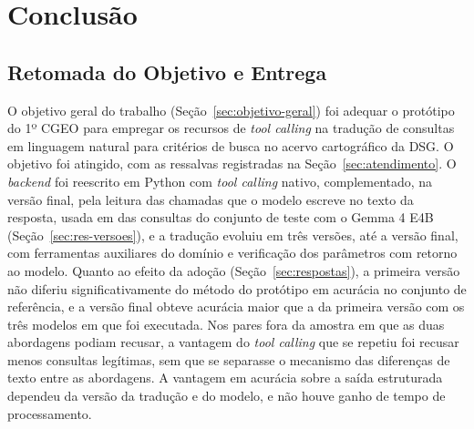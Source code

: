 \chapter{Conclusão}
\label{cap:conclusao}

\section{Retomada do Objetivo e Entrega}
\label{sec:retomada}

O objetivo geral do trabalho (Seção~\ref{sec:objetivo-geral}) foi adequar o protótipo do 1º CGEO para empregar os recursos de \textit{tool calling} na tradução de consultas em linguagem natural para critérios de busca no acervo cartográfico da DSG. O objetivo foi atingido, com as ressalvas registradas na Seção~\ref{sec:atendimento}. O \textit{backend} foi reescrito em Python com \textit{tool calling} nativo, complementado, na versão final, pela leitura das chamadas que o modelo escreve no texto da resposta, usada em  das consultas do conjunto de teste com o Gemma 4 E4B (Seção~\ref{sec:res-versoes}), e a tradução evoluiu em três versões, até a versão final, com ferramentas auxiliares do domínio e verificação dos parâmetros com retorno ao modelo. Quanto ao efeito da adoção (Seção~\ref{sec:respostas}), a primeira versão não diferiu significativamente do método do protótipo em acurácia no conjunto de referência, e a versão final obteve acurácia maior que a da primeira versão com os três modelos em que foi executada. Nos pares fora da amostra em que as duas abordagens podiam recusar, a vantagem do \textit{tool calling} que se repetiu foi recusar menos consultas legítimas, sem que se separasse o mecanismo das diferenças de texto entre as abordagens. A vantagem em acurácia sobre a saída estruturada dependeu da versão da tradução e do modelo, e não houve ganho de tempo de processamento.

